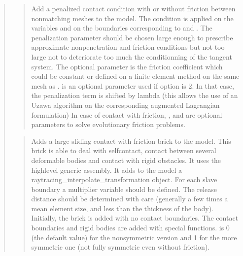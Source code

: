 \documentclass[a4paper,11pt,english]{sphinxmanual}
\begin{document}
\begin{quote}
\sphinxAtStartPar
{}
\begin{quote}

\sphinxAtStartPar
Add a penalized contact condition with or without friction between
nonmatching meshes to the model.
The condition is applied on the variables  and  
on the boundaries corresponding to  and .
The penalization parameter  should be chosen
large enough to prescribe approximate non\sphinxhyphen{}penetration and friction
conditions but not too large not to deteriorate too much the
conditionning of the tangent system.
The optional parameter  is the friction
coefficient which could be constant or defined on a finite element
method on the same mesh as .
 is an optional parameter used if option
is 2. In that case, the penalization term is shifted by lambda (this
allows the use of an Uzawa algorithm on the corresponding augmented
Lagrangian formulation)
In case of contact with friction, ,  and
 are optional parameters to solve evolutionary friction
problems.
\end{quote}

\sphinxAtStartPar
{}
\begin{quote}

\sphinxAtStartPar
Adds a large sliding contact with friction brick to the model.
This brick is able to deal with self\sphinxhyphen{}contact, contact between
several deformable bodies and contact with rigid obstacles.
It uses the high\sphinxhyphen{}level generic assembly. It adds to the model
a raytracing\_interpolate\_transformation object.
For each slave boundary a multiplier variable should be defined.
The release distance should be determined with care
(generally a few times a mean element size, and less than the
thickness of the body). Initially, the brick is added with no contact
boundaries. The contact boundaries and rigid bodies are added with
special functions.  is 0 (the default value) for the
non\sphinxhyphen{}symmetric version and 1 for the more symmetric one
(not fully symmetric even without friction).
\end{quote}


\end{quote}
\end{document}
